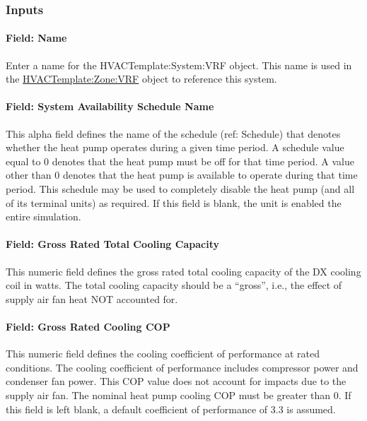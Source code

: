 \subsubsection{Inputs}\label{inputs-14-005}

\paragraph{Field: Name}\label{field-name-1-021}

Enter a name for the HVACTemplate:System:VRF object. This name is used in the \hyperref[hvactemplatezonevrf]{HVACTemplate:Zone:VRF} object to reference this system.

\paragraph{Field: System Availability Schedule Name}\label{field-system-availability-schedule-name-6}

This alpha field defines the name of the schedule (ref: Schedule) that denotes whether the heat pump operates during a given time period. A schedule value equal to 0 denotes that the heat pump must be off for that time period. A value other than 0 denotes that the heat pump is available to operate during that time period. This schedule may be used to completely disable the heat pump (and all of its terminal units) as required. If this field is blank, the unit is enabled the entire simulation.

\paragraph{Field: Gross Rated Total Cooling Capacity}\label{field-gross-rated-total-cooling-capacity-000}

This numeric field defines the gross rated total cooling capacity of the DX cooling coil in watts. The total cooling capacity should be a ``gross'', i.e., the effect of supply air fan heat NOT accounted for.

\paragraph{Field: Gross Rated Cooling COP}\label{field-gross-rated-cooling-cop-000}

This numeric field defines the cooling coefficient of performance at rated conditions. The cooling coefficient of performance includes compressor power and condenser fan power. This COP value does not account for impacts due to the supply air fan. The nominal heat pump cooling COP must be greater than 0. If this field is left blank, a default coefficient of performance of 3.3 is assumed.

